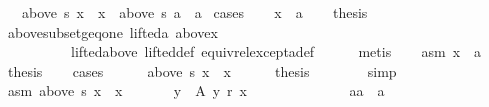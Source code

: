 \begin{isabellebody}
\ \ \ {\isachardoublequoteopen}above\ s\ x\ {\isacharequal}{\kern0pt}\ {\isacharbraceleft}{\kern0pt}x{\isacharbraceright}{\kern0pt}\ {\isasymor}\ above\ s\ a\ {\isacharequal}{\kern0pt}\ {\isacharbraceleft}{\kern0pt}a{\isacharbraceright}{\kern0pt}{\isachardoublequoteclose}\isanewline
%
\isadelimproof
%
\endisadelimproof
%
\isatagproof
{}\isamarkupfalse%
\ cases\isanewline
\ \ \isamarkupfalse%
\ {\isachardoublequoteopen}x\ {\isacharequal}{\kern0pt}\ a{\isachardoublequoteclose}\isanewline
\ \ \isamarkupfalse%
\ {\isacharquery}{\kern0pt}thesis\isanewline
\ \ \ \ \isamarkupfalse%
\ above{\isacharunderscore}{\kern0pt}subset{\isacharunderscore}{\kern0pt}geq{\isacharunderscore}{\kern0pt}one\ lifted{\isacharunderscore}{\kern0pt}a\ above{\isacharunderscore}{\kern0pt}x\isanewline
\ \ \ \ \ \ \ \ \ \ lifted{\isacharunderscore}{\kern0pt}above\ lifted{\isacharunderscore}{\kern0pt}def\ equiv{\isacharunderscore}{\kern0pt}rel{\isacharunderscore}{\kern0pt}except{\isacharunderscore}{\kern0pt}a{\isacharunderscore}{\kern0pt}def\isanewline
\ \ \ \ \isamarkupfalse%
\ metis\isanewline
{}\isamarkupfalse%
\isanewline
\ \ \isamarkupfalse%
\ asm{}{\isacharcolon}{\kern0pt}\ {\isachardoublequoteopen}x\ {\isasymnoteq}\ a{\isachardoublequoteclose}\isanewline
\ \ \isamarkupfalse%
\ {\isacharquery}{\kern0pt}thesis\isanewline
\ \ \isamarkupfalse%
\ cases\isanewline
\ \ \ \ \isamarkupfalse%
\ {\isachardoublequoteopen}above\ s\ x\ {\isacharequal}{\kern0pt}\ {\isacharbraceleft}{\kern0pt}x{\isacharbraceright}{\kern0pt}{\isachardoublequoteclose}\isanewline
\ \ \ \ \isamarkupfalse%
\ {\isacharquery}{\kern0pt}thesis\isanewline
\ \ \ \ \ \ \isamarkupfalse%
\ simp\isanewline
\ \ \isamarkupfalse%
\isanewline
\ \ \ \ \isamarkupfalse%
\ asm{}{\isacharcolon}{\kern0pt}\ {\isachardoublequoteopen}above\ s\ x\ {\isasymnoteq}\ {\isacharbraceleft}{\kern0pt}x{\isacharbraceright}{\kern0pt}{\isachardoublequoteclose}\ \isanewline
\ \ \ \ \isamarkupfalse%
\ {\isachardoublequoteopen}{\isasymforall}y\ {\isasymin}\ A{\isachardot}{\kern0pt}\ y\ {\isasympreceq}\isactrlsub r\ x{\isachardoublequoteclose}\isanewline
\ \ \ \ \isamarkupfalse%
\ {\isacharminus}{\kern0pt}\isanewline
\ \ \ \ \ \ \isamarkupfalse%
\ aa\ {\isacharcolon}{\kern0pt}{\isacharcolon}{\kern0pt}\ {\isacharprime}{\kern0pt}a\isanewline

\end{isabellebody}
